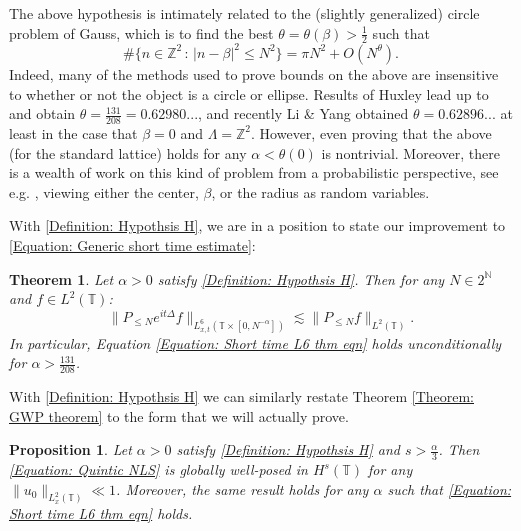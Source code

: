 \documentclass[12pt, letterpaper]{amsart}
\newtheorem{theorem}{Theorem}
\newtheorem{proposition}{Proposition}
\begin{document}
The above hypothesis is intimately related to the (slightly generalized) circle problem of Gauss, which is to find the best $\theta = \theta(\beta) > \frac12$ such that
\[
\#\{n\in\mathbb{Z}^2\,:\,|n-\beta|^2\leq N^2\} = \pi N^2 + O(N^\theta).
\]
Indeed, many of the methods used to prove bounds on the above are insensitive to whether or not the object is a circle or ellipse. Results of Huxley \cite{MR1044308, MR1199067, MR2005876} lead up to and obtain $\theta = \frac{131}{208} = 0.62980...$, and recently Li \& Yang \cite{li2023improvement} obtained $\theta = 0.62896...$ at least in the case that $\beta = 0$ and $\Lambda = \mathbb{Z}^2$. However, even proving that the above (for the standard lattice) holds for any $\alpha < \theta(0)$ is nontrivial. Moreover, there is a wealth of work on this kind of problem from a probabilistic perspective, see e.g. \cite{MR2039790, MR2226267, MR2253596, MR4302203, MR1246066, MR1257819, MR1224087}, viewing either the center, $\beta$, or the radius as random variables.

With \ref{Definition: Hypothsis H}, we are in a position to state our improvement to \eqref{Equation: Generic short time estimate}:
\begin{theorem}\label{Theorem: Short Time Strichartz}
    Let $\alpha > 0$ satisfy \ref{Definition: Hypothsis H}. Then for any $N\in 2^\mathbb{N}$ and $f\in L^2(\mathbb{T})$:
    \begin{equation}\label{Equation: Short time L6 thm eqn}
\|P_{\leq N} e^{it\Delta}f\|_{L^6_{x,t}(\mathbb{T}\times[0,N^{-\alpha}])}\lesssim \|P_{\leq N}f\|_{L^2(\mathbb{T})}.
    \end{equation}
    In particular, Equation \ref{Equation: Short time L6 thm eqn} holds unconditionally for $\alpha > \frac{131}{208}$.
\end{theorem}
With \ref{Definition: Hypothsis H} we can similarly restate Theorem \ref{Theorem: GWP theorem} to the form that we will actually prove.
\begin{proposition}
    Let $\alpha > 0$ satisfy \ref{Definition: Hypothsis H} and $s > \frac\alpha3$. Then \eqref{Equation: Quintic NLS} is globally well-posed in $H^s(\mathbb{T})$ for any $\|u_0\|_{L^2_{x}(\mathbb{T})}\ll 1$. Moreover, the same result holds for any $\alpha$ such that \eqref{Equation: Short time L6 thm eqn} holds.
\end{proposition}
\end{document}
